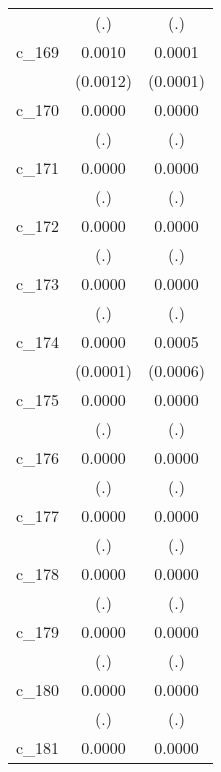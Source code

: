 {\begin{tabular}{l*{2}{c}}
            &         (.)        &         (.)        \\
[1em]
c\_169       &      0.0010        &      0.0001        \\
            &    (0.0012)        &    (0.0001)        \\
[1em]
c\_170       &      0.0000        &      0.0000        \\
            &         (.)        &         (.)        \\
[1em]
c\_171       &      0.0000        &      0.0000        \\
            &         (.)        &         (.)        \\
[1em]
c\_172       &      0.0000        &      0.0000        \\
            &         (.)        &         (.)        \\
[1em]
c\_173       &      0.0000        &      0.0000        \\
            &         (.)        &         (.)        \\
[1em]
c\_174       &      0.0000        &      0.0005        \\
            &    (0.0001)        &    (0.0006)        \\
[1em]
c\_175       &      0.0000        &      0.0000        \\
            &         (.)        &         (.)        \\
[1em]
c\_176       &      0.0000        &      0.0000        \\
            &         (.)        &         (.)        \\
[1em]
c\_177       &      0.0000        &      0.0000        \\
            &         (.)        &         (.)        \\
[1em]
c\_178       &      0.0000        &      0.0000        \\
            &         (.)        &         (.)        \\
[1em]
c\_179       &      0.0000        &      0.0000        \\
            &         (.)        &         (.)        \\
[1em]
c\_180       &      0.0000        &      0.0000        \\
            &         (.)        &         (.)        \\
[1em]
c\_181       &      0.0000        &      0.0000        \\

\end{tabular}}
